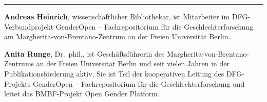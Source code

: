 \begin{center}\rule{0.5\linewidth}{\linethickness}\end{center}

\textbf{Andreas Heinrich}, wissenschaftlicher Bibliothekar, ist
Mitarbeiter im DFG-Verbundprojekt GenderOpen -- Fachrepositorium für die
Geschlechterforschung am Margherita-von-Brentano-Zentrum an der Freien
Universität Berlin.

\textbf{Anita Runge}, Dr.~phil., ist Geschäftsführerin des
Margherita-von-Brentano-Zentrums an der Freien Universität Berlin und
seit vielen Jahren in der Publikationsförderung aktiv. Sie ist Teil der
kooperativen Leitung des DFG-Projekts GenderOpen -- Fachrepositorium
für die Geschlechterforschung und leitet das BMBF-Projekt Open Gender
Platform.
